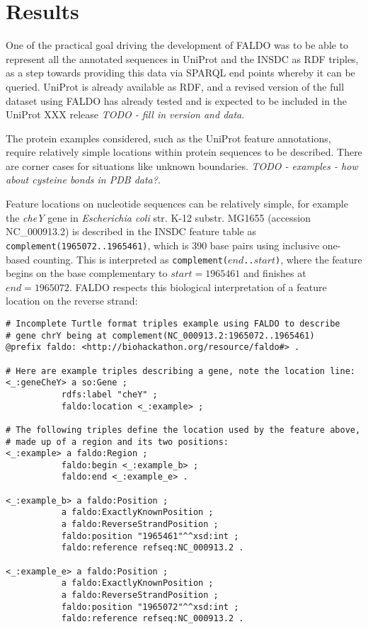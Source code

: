 \section*{Results}
One of the practical goal driving the development of FALDO was to be able
to represent all the annotated sequences in UniProt and the INSDC as RDF
triples, as a step towards providing this data via SPARQL end points whereby
it can be queried.
UniProt is already available as RDF, and a revised version of the full
dataset using FALDO has already tested and is expected to be included
in the UniProt XXX release \textit{TODO - fill in version and data}.

The protein examples considered, such as the UniProt feature annotations,
require relatively simple locations within protein sequences to be described.
There are corner cases for situations like unknown boundaries.
\textit{TODO - examples - how about cysteine bonds in PDB data?}.

Feature locations on nucleotide sequences can be relatively simple,
for example the \textit{cheY} gene in
\textit{Escherichia coli} str. K-12 substr. MG1655 (accession NC\_000913.2)
is described in the INSDC feature table as \texttt{complement(1965072..1965461)},
which is 390 base pairs using inclusive one-based counting.
This is interpreted as \texttt{complement($end$..$start$)}, where
the feature begins on the base complementary to $start = 1965461$
and finishes at $end = 1965072$. FALDO respects this biological
interpretation of a feature location on the reverse strand:

\begin{verbatim}
# Incomplete Turtle format triples example using FALDO to describe
# gene chrY being at complement(NC_000913.2:1965072..1965461)
@prefix faldo: <http://biohackathon.org/resource/faldo#> .

# Here are example triples describing a gene, note the location line:
<_:geneCheY> a so:Gene ;
           rdfs:label "cheY" ;
           faldo:location <_:example> ;

# The following triples define the location used by the feature above,
# made up of a region and its two positions:
<_:example> a faldo:Region ;
           faldo:begin <_:example_b> ;
           faldo:end <_:example_e> .

<_:example_b> a faldo:Position ; 
           a faldo:ExactlyKnownPosition ;
           a faldo:ReverseStrandPosition ;
           faldo:position "1965461"^^xsd:int ;
           faldo:reference refseq:NC_000913.2 .

<_:example_e> a faldo:Position ; 
           a faldo:ExactlyKnownPosition ;
           a faldo:ReverseStrandPosition ;
           faldo:position "1965072"^^xsd:int ;
           faldo:reference refseq:NC_000913.2 .
\end{verbatim}

